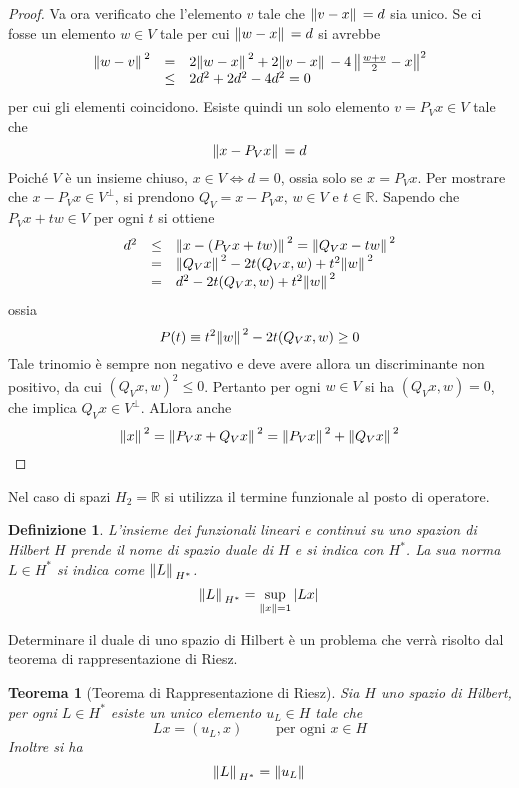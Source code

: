 \documentclass[a4paper,12pt, draft]{article}
\theoremstyle{break}
\newtheorem{theorem}{Teorema}[section]
\newtheorem{definition}{Definizione}[section]
\numberwithin{equation}{section}
\begin{document}
\begin{proof}
    Va ora verificato che l'elemento \(v\) tale che \(\norm*{v - x} = d\) sia unico. Se ci fosse un elemento \(w \in V\) tale per cui \(\norm*{w - x} = d\) si avrebbe
    \[
    \begin{array}{lcl}
      \norm*{w -v}^2 & = & 2\norm*{w - x}^2 + 2\norm*{v - x} - 4\left\|\frac{w+v}{2} -x \right\|^2 \\
      & \leq & 2d^2 + 2d^2 - 4d^2 = 0
    \end{array}
    \]
    per cui gli elementi coincidono. Esiste quindi un solo elemento \(v = P_V x \in V\) tale che 
    \[
      \norm*{x - P_V x} = d
    \]
    Poiché \(V\) è un insieme chiuso, \(x \in V \Leftrightarrow d = 0\), ossia solo se \(x = P_V x\).
    Per mostrare che \(x - P_Vx \in V^{\perp}\), si prendono \(Q_V = x- P_V x, \, w \in V\) e \(t \in \mathbb{R}\). Sapendo che \(P_V x + tw \in V\) per ogni \(t\) si ottiene
    \[
    \begin{array}{lcl}
      d^2 & \leq & \norm*{x - (P_V x + tw)}^2 = \norm*{Q_V x - tw}^2 \\
      & = & \norm*{Q_Vx}^2 - 2t (Q_Vx, w) + t^2\norm*{w}^2 \\
      & = & d^2 - 2t(Q_V x, w) + t^2 \norm*{w}^2
    \end{array}  
    \]
    ossia 
    \[
    P(t) \equiv t^2 \norm*{w}^2 - 2t (Q_V x, w)  \geq 0 
    \]
    Tale trinomio è sempre non negativo e deve avere allora un discriminante non positivo, da cui \((Q_V x, w)^2 \leq 0\). Pertanto per ogni \(w \in V\) si ha \((Q_V x, w) = 0\), che implica \(Q_V x \in V^{\perp}\). ALlora anche 
    \[\norm*{x}^2 = \norm*{P_V x + Q_V x}^2 =\norm*{P_V x}^2 + \norm*{Q_V x}^2\]
\end{proof}
Nel caso di spazi \(H_2= \mathbb{R}\) si utilizza il termine funzionale al posto di operatore.
\begin{definition}
  L'insieme dei funzionali lineari e continui su uno spazion di Hilbert \(H\) prende il nome di spazio duale di \(H\) e si indica con \(H^*\). La sua norma \(L \in H^*\) si indica come \(\norm*{L}_{H^*}\).
  \[
  \norm*{L}_{H^*} = \sup_{\norm*{x}  = 1} \abs*{Lx}
  \]
\end{definition}
Determinare il duale di uno spazio di Hilbert è un problema che verrà risolto dal teorema di rappresentazione di Riesz. 
\begin{theorem}[Teorema di Rappresentazione di Riesz]
  Sia \(H\) uno spazio di Hilbert, per ogni \(L \in H^*\) esiste un unico elemento \(u_L \in H\) tale che 
  \begin{equation}
    Lx = (u_L, x) \qquad \mbox{ per ogni } x \in H
  \end{equation}
  Inoltre si ha 
  \begin{equation}
    \norm*{L}_{H^*} = \norm*{u_L}
  \end{equation}
\end{theorem}
\end{document}
